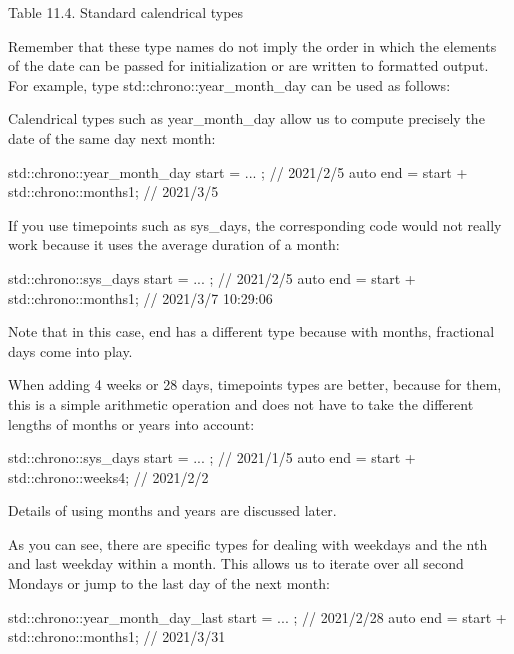 \begin{center}
Table 11.4. Standard calendrical types
\end{center}

Remember that these type names do not imply the order in which the elements of the date can be passed for initialization or are written to formatted output. For example, type std::chrono::year\_month\_day can be used as follows:


Calendrical types such as year\_month\_day allow us to compute precisely the date of the same day next month:

\begin{cpp}
std::chrono::year_month_day start = ... ; // 2021/2/5
auto end = start + std::chrono::months{1}; // 2021/3/5
\end{cpp}

If you use timepoints such as sys\_days, the corresponding code would not really work because it uses the average duration of a month:

\begin{cpp}
std::chrono::sys_days start = ... ; // 2021/2/5
auto end = start + std::chrono::months{1}; // 2021/3/7 10:29:06
\end{cpp}

Note that in this case, end has a different type because with months, fractional days come into play.

When adding 4 weeks or 28 days, timepoints types are better, because for them, this is a simple arithmetic operation and does not have to take the different lengths of months or years into account:

\begin{cpp}
std::chrono::sys_days start = ... ; // 2021/1/5
auto end = start + std::chrono::weeks{4}; // 2021/2/2
\end{cpp}

Details of using months and years are discussed later.

As you can see, there are specific types for dealing with weekdays and the nth and last weekday within a month. This allows us to iterate over all second Mondays or jump to the last day of the next month:

\begin{cpp}
std::chrono::year_month_day_last start = ... ; // 2021/2/28
auto end = start + std::chrono::months{1}; // 2021/3/31
\end{cpp}

